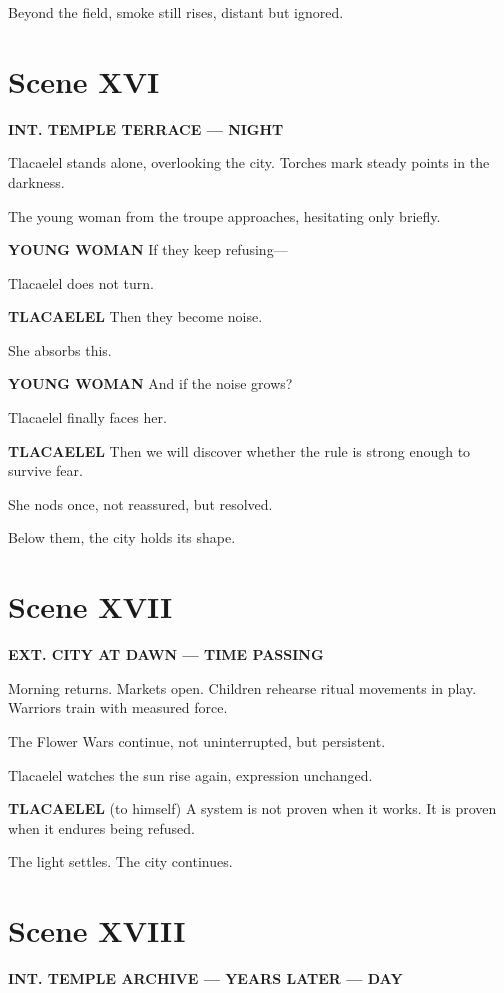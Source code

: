 \documentclass[12pt]{article}
\begin{document}
Beyond the field, smoke still rises, distant but ignored.

\section*{Scene XVI}

\textbf{INT. TEMPLE TERRACE --- NIGHT}

Tlacaelel stands alone, overlooking the city. Torches mark steady points in the darkness.

The young woman from the troupe approaches, hesitating only briefly.

\textbf{YOUNG WOMAN}  
If they keep refusing—

Tlacaelel does not turn.

\textbf{TLACAELEL}  
Then they become noise.

She absorbs this.

\textbf{YOUNG WOMAN}  
And if the noise grows?

Tlacaelel finally faces her.

\textbf{TLACAELEL}  
Then we will discover whether the rule is strong enough to survive fear.

She nods once, not reassured, but resolved.

Below them, the city holds its shape.

\section*{Scene XVII}

\textbf{EXT. CITY AT DAWN --- TIME PASSING}

Morning returns. Markets open. Children rehearse ritual movements in play. Warriors train with measured force.

The Flower Wars continue, not uninterrupted, but persistent.

Tlacaelel watches the sun rise again, expression unchanged.

\textbf{TLACAELEL}  
(to himself)  
A system is not proven when it works.  
It is proven when it endures being refused.

The light settles. The city continues.

\section*{Scene XVIII}

\textbf{INT. TEMPLE ARCHIVE --- YEARS LATER --- DAY}
\end{document}
